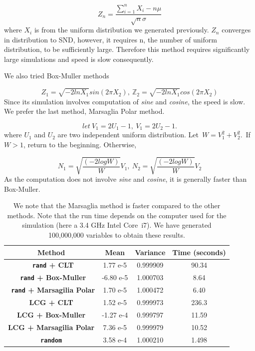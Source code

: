 \documentclass[11pt,a4paper,fleqn]{article}
\newcommand\Z{\mathbb Z}
\begin{document}
$$ Z_n = \frac{\sum_{i=1}^{n}X_i-n\mu}{\sqrt{n}\sigma}$$where $X_i$ is from the uniform distribution we generated previously. $Z_n$ converges in distribution to SND, however, it requires n, the number of uniform distribution, to be sufficiently large. Therefore this method requires significantly large simulations and speed is slow consequently.

We also tried Box-Muller methods  \cite{lectures}

$$Z_1 = \sqrt{-2lnX_1}sin(2\pi X_2),\  \Z_2=\sqrt{-2lnX_1}cos(2\pi X_2)$$Since its simulation involves computation of \textit{sine} and \textit{cosine}, the speed is slow.
We prefer the last method, Marsaglia Polar method.

$$ let \ V_1 = 2U_1-1,\  V_1 = 2U_2-1.$$
where $U_1$ and $U_2$ are two independent uniform distribution.
 Let\ $W = V_1^2+V_2^2.$\ If $W>1$, return to the beginning. Otherwise,

$$N_1 = \sqrt{\frac{(-2logW)}{W}}V_1,\ N_2 = \sqrt{\frac{(-2logW)}{W}}V_2$$As the computation does not involve \textit{sine} and \textit{cosine}, it is generally faster than Box-Muller.



\begin{table} [h!]
\centering
\begin{tabular}{| c| c| c| c| }
\hline
\textbf{ Method} &\textbf{ Mean} & \textbf{Variance}&\textbf{ Time (seconds)} \\ \hline
\textbf{\texttt{ rand}  + CLT} & 1.77 e-5 & 0.999909 & 90.34 \\  \hline
\textbf{\texttt{ rand}  + Box-Muller} & -6.80 e-5 & 1.000703&8.64\\ \hline
\textbf{\texttt{ rand}  + Marsagilia Polar} & 1.70 e-5& 1.000472& 6.40\\ \hline
\textbf{ LCG + CLT} & 1.52 e-5& 0.999973&236.3\\ \hline
\textbf{LCG + Box-Muller} & -1.27 e-4 & 0.999797&11.59\\ \hline
\textbf{ LCG + Marsagilia Polar} & 7.36 e-5 & 0.999979&10.52\\ \hline
\textbf{\texttt{random} }& 3.58 e-4 & 1.000210&1.498\\ \hline
\end{tabular}
\caption{We note that the Marsaglia method is faster compared to the other methods. Note that the run time depends on the computer used for the simulation (here a 3.4 GHz Intel Core~i7). We have generated 100,000,000 variables to obtain these results.}
\end{table}
\end{document}
